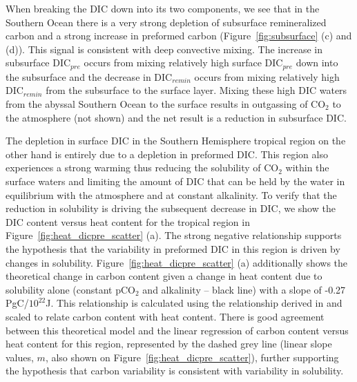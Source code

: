 When breaking the DIC down into its two components, we see that in
the Southern Ocean there is a very strong depletion of subsurface remineralized
carbon and a strong increase in preformed carbon (Figure~\ref{fig:subsurface}
(c) and (d)). This signal is consistent with deep convective mixing. The
increase in subsurface DIC$_{pre}$ occurs from mixing relatively high surface
DIC$_{pre}$ down into the subsurface and the decrease in DIC$_{remin}$ occurs from
mixing relatively high DIC$_{remin}$ from the subsurface to the surface layer.
Mixing these high DIC waters from the abyssal Southern Ocean to the surface
results in outgassing of CO$_2$ to the atmosphere (not shown) and the net result
is a reduction in subsurface DIC.

The depletion in surface DIC in the Southern Hemisphere tropical region on the
other hand is entirely due to a depletion in preformed DIC. This region also
experiences a strong warming thus reducing the solubility of CO$_{\mathrm{2}}$
within the surface waters and
limiting the amount of DIC that can be held by the water in equilibrium with the
atmosphere and at constant alkalinity. To verify that the reduction
in solubility is driving the subsequent decrease in DIC, we show the
DIC content versus heat content for the tropical region in
Figure~\ref{fig:heat_dicpre_scatter} (a). The strong negative relationship
supports the hypothesis that the variability in preformed DIC in this region is
driven by changes in solubility. Figure~\ref{fig:heat_dicpre_scatter} (a)
additionally shows the theoretical change in carbon content given a change in
heat content due to solubility alone (constant pCO$_{\mathrm{2}}$ and alkalinity
-- black line) with a slope of  -0.27 PgC/$10^{22}$J. This relationship is calculated using the relationship derived
in \citet{Gruber1996} and scaled to relate carbon content with heat content.
There is good agreement between this theoretical model and the linear regression of carbon content
versus heat content for this region, represented by the dashed grey line (linear slope
values, $m$, also shown on Figure~\ref{fig:heat_dicpre_scatter}),
 further supporting the hypothesis that carbon variability is consistent
with variability in solubility.

